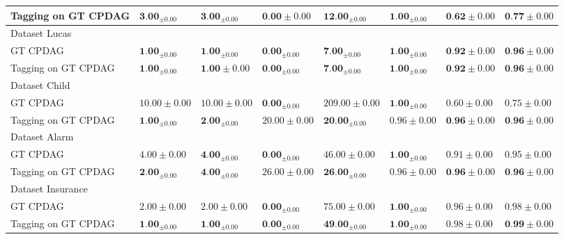 \documentclass[10pt]{article}
\begin{document}
\begin{table}[h]
\begin{center}
\begin{tabular}{|l|l|l|l|l|l|l|l|}
\hline
Tagging on GT CPDAG & $\mathbf{3 . 0 0}_{ \pm 0.00}$ & $\mathbf{3 . 0 0}_{ \pm 0.00}$ & $\mathbf{0 . 0 0} \pm 0.00$ & $\mathbf{1 2 . 0 0}_{ \pm 0.00}$ & $\mathbf{1 . 0 0}_{ \pm 0.00}$ & $\mathbf{0 . 6 2} \pm 0.00$ & $\mathbf{0 . 7 7} \pm 0.00$ \\
\hline
Dataset Lucas & \multicolumn{7}{|c|}{} \\
\hline
GT CPDAG & $\mathbf{1 . 0 0}_{ \pm 0.00}$ & $\mathbf{1 . 0 0}_{ \pm 0.00}$ & $\mathbf{0 . 0 0}_{ \pm 0.00}$ & $\mathbf{7 . 0 0}_{ \pm 0.00}$ & $\mathbf{1 . 0 0}_{ \pm 0.00}$ & $\mathbf{0 . 9 2} \pm 0.00$ & $\mathbf{0 . 9 6} \pm 0.00$ \\
\hline
Tagging on GT CPDAG & $\mathbf{1 . 0 0}_{ \pm 0.00}$ & $\mathbf{1 . 0 0} \pm 0.00$ & $\mathbf{0 . 0 0}_{ \pm 0.00}$ & $\mathbf{7 . 0 0}_{ \pm 0.00}$ & $\mathbf{1 . 0 0}_{ \pm 0.00}$ & $\mathbf{0 . 9 2} \pm 0.00$ & $\mathbf{0 . 9 6} \pm 0.00$ \\
\hline
Dataset Child & \multicolumn{7}{|c|}{} \\
\hline
GT CPDAG & $10.00 \pm 0.00$ & $10.00 \pm 0.00$ & $\mathbf{0 . 0 0}_{ \pm 0.00}$ & $209.00 \pm 0.00$ & $\mathbf{1 . 0 0}_{ \pm 0.00}$ & $0.60 \pm 0.00$ & $0.75 \pm 0.00$ \\
\hline
Tagging on GT CPDAG & $\mathbf{1 . 0 0}_{ \pm 0.00}$ & $\mathbf{2 . 0 0}_{ \pm 0.00}$ & $20.00 \pm 0.00$ & $\mathbf{2 0 . 0 0}_{ \pm 0.00}$ & $0.96 \pm 0.00$ & $\mathbf{0 . 9 6} \pm 0.00$ & $\mathbf{0 . 9 6} \pm 0.00$ \\
\hline
Dataset Alarm & \multicolumn{7}{|c|}{} \\
\hline
GT CPDAG & $4.00 \pm 0.00$ & $\mathbf{4 . 0 0}_{ \pm 0.00}$ & $\mathbf{0 . 0 0}_{ \pm 0.00}$ & $46.00 \pm 0.00$ & $\mathbf{1 . 0 0}_{ \pm 0.00}$ & $0.91 \pm 0.00$ & $0.95 \pm 0.00$ \\
\hline
Tagging on GT CPDAG & $\mathbf{2 . 0 0}_{ \pm 0.00}$ & $\mathbf{4 . 0 0}_{ \pm 0.00}$ & $26.00 \pm 0.00$ & $\mathbf{2 6 . 0 0}_{ \pm 0.00}$ & $0.96 \pm 0.00$ & $\mathbf{0 . 9 6} \pm 0.00$ & $\mathbf{0 . 9 6} \pm 0.00$ \\
\hline
Dataset Insurance & \multicolumn{7}{|c|}{} \\
\hline
GT CPDAG & $2.00 \pm 0.00$ & $2.00 \pm 0.00$ & $\mathbf{0 . 0 0}_{ \pm 0.00}$ & $75.00 \pm 0.00$ & $\mathbf{1 . 0 0}_{ \pm 0.00}$ & $0.96 \pm 0.00$ & $0.98 \pm 0.00$ \\
\hline
Tagging on GT CPDAG & $\mathbf{1 . 0 0}_{ \pm 0.00}$ & $\mathbf{1 . 0 0}_{ \pm 0.00}$ & $\mathbf{0 . 0 0}_{ \pm 0.00}$ & $\mathbf{4 9 . 0 0}_{ \pm 0.00}$ & $\mathbf{1 . 0 0}_{ \pm 0.00}$ & $0.98 \pm 0.00$ & $\mathbf{0 . 9 9} \pm 0.00$ \\

\end{tabular}
\end{center}
\end{table}
\end{document}
